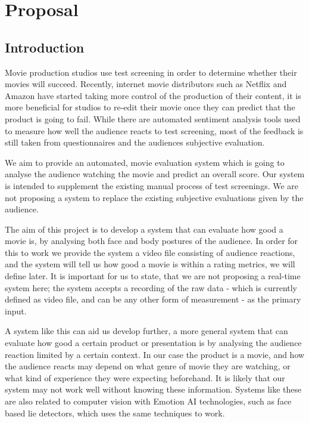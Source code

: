 \documentclass[12pt,a4paper,man]{report}
\begin{document}
\pagestyle{fancy}
\fancyhf{}
\rhead{\thepage}
\lhead{\parttitle{}: \leftmark}
\cfoot{\thepage}
\renewcommand{\chaptermark}[1]{\markboth{#1}{}}

\part{Proposal}
\label{sec:org213320b}
\chapter{Introduction}
\label{sec:org000e520}

Movie production studios use test screening in order to determine whether their movies will succeed. Recently, internet movie distributors such as Netflix and Amazon have started taking more control of the production of their content, it is more beneficial for studios to re-edit their movie once they can predict that the product is going to fail. While there are automated sentiment analysis tools used to measure how well the audience reacts to test screening, most of the feedback is still taken from questionnaires and the audiences subjective evaluation.

We aim to provide an automated, movie evaluation system which is going to analyse the audience watching the movie and predict an overall score. Our system is intended to supplement the existing manual process of test screenings. We are not proposing a system to replace the existing subjective evaluations given by the audience.

The aim of this project is to develop a system that can evaluate how good a movie is, by analysing both face and body postures of the audience. In order for this to work we provide the system a video file consisting of audience reactions, and the system will tell us how good a movie is within a rating metrics, we will define later. It is important for us to state, that we are not proposing a real-time system here; the system accepts a recording of the raw data - which is currently defined as video file, and can be any other form of measurement - as the primary input.

A system like this can aid us develop further, a more general system that can evaluate how good a certain product or presentation is by analysing the audience reaction limited by a certain context. In our case the product is a movie, and how the audience reacts may depend on what genre of movie they are watching, or what kind of experience they were expecting beforehand. It is likely that our system may not work well without knowing these information. Systems like these are also related to computer vision with Emotion AI technologies, such as face based lie detectors, which uses the same techniques to work.
\end{document}
